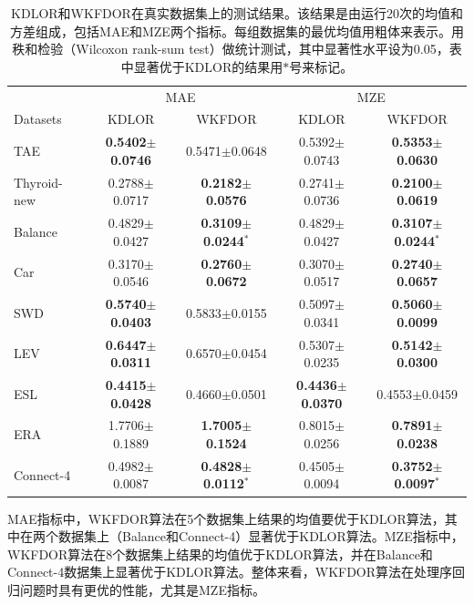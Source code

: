 \begin{table}[htbp]
\caption{KDLOR和WKFDOR在真实数据集上的测试结果。该结果是由运行20次的均值和方差组成，包括MAE和MZE两个指标。每组数据集的最优均值用粗体来表示。用秩和检验（Wilcoxon rank-sum test）做统计测试，其中显著性水平设为0.05，表中显著优于KDLOR的结果用$*$号来标记。}
\label{table_realResults20m}
\centering
\begin{tabular}{l|cc|cc}
\toprule
 & \multicolumn {2}{c|}{MAE} & \multicolumn {2}{c}{MZE} \\
 \cmidrule {2-5}
Datasets & KDLOR & WKFDOR & KDLOR & WKFDOR\\
\midrule
TAE &  {\bf 0.5402$\pm$0.0746} &  0.5471$\pm$0.0648 & 0.5392$\pm$0.0743 & {\bf 0.5353$\pm$0.0630} \\
Thyroid-new & 0.2788$\pm$0.0717 &  {\bf 0.2182$\pm$0.0576} & 0.2741$\pm$0.0736 & {\bf 0.2100$\pm$0.0619} \\
Balance & 0.4829$\pm$0.0427 &  {\bf 0.3109$\pm$0.0244}$^{*}$ & 0.4829$\pm$0.0427 & {\bf 0.3107$\pm$0.0244}$^{*}$ \\
Car & 0.3170$\pm$0.0546 &  {\bf 0.2760$\pm$0.0672} & 0.3070$\pm$0.0517 & {\bf 0.2740$\pm$0.0657} \\
SWD & {\bf 0.5740$\pm$0.0403} &  0.5833$\pm$0.0155 & 0.5097$\pm$0.0341 & {\bf 0.5060$\pm$0.0099} \\
LEV & {\bf 0.6447$\pm$0.0311} &  0.6570$\pm$0.0454 & 0.5307$\pm$0.0235 & {\bf 0.5142$\pm$0.0300} \\
ESL & {\bf 0.4415$\pm$0.0428} &  0.4660$\pm$0.0501 & {\bf 0.4436$\pm$0.0370} & 0.4553$\pm$0.0459 \\
ERA & 1.7706$\pm$0.1889 &  {\bf 1.7005$\pm$0.1524} & 0.8015$\pm$0.0256 & {\bf 0.7891$\pm$0.0238} \\
Connect-4 & 0.4982$\pm$0.0087 & {\bf 0.4828$\pm$0.0112}$^{*}$ & 0.4505$\pm$0.0094 & {\bf 0.3752$\pm$0.0097}$^{*}$ \\
\bottomrule
\end{tabular}
\end{table}

MAE指标中，WKFDOR算法在5个数据集上结果的均值要优于KDLOR算法，其中在两个数据集上（Balance和Connect-4）显著优于KDLOR算法。MZE指标中，WKFDOR算法在8个数据集上结果的均值优于KDLOR算法，并在Balance和Connect-4数据集上显著优于KDLOR算法。整体来看，WKFDOR算法在处理序回归问题时具有更优的性能，尤其是MZE指标。

